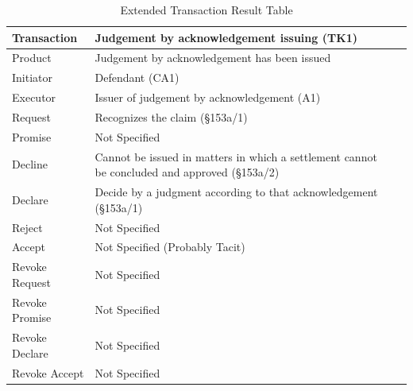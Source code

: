 \begin{landscape}
\begin{table}[h]
\caption{Extended Transaction Result Table}
\label{tab:etrt}
\begin{tabular}{|l||l|l|}
\hline
Transaction  & Judgement by acknowledgement issuing (TK1) \\ \hline
Product      & Judgement by acknowledgement has been issued   \\ \hline
Initiator      & Defendant (CA1) \\ \hline
Executor       & Issuer of judgement by acknowledgement (A1)      \\ \hline
Request        & Recognizes the claim (\S153a/1)   \\ \hline
Promise        & Not Specified   \\ \hline
Decline        &  Cannot be issued in matters in which a settlement cannot be concluded and approved  (\S153a/2)  \\ \hline
Declare        & Decide by a judgment according to that acknowledgement (\S153a/1)  \\ \hline
Reject         &  Not Specified   \\ \hline
Accept         & Not Specified (Probably Tacit) \\ \hline
Revoke Request & Not Specified \\ \hline
Revoke Promise & Not Specified \\ \hline
Revoke Declare & Not Specified  \\ \hline
Revoke Accept  &  Not Specified   \\ \hline
\end{tabular}
\end{table}


\end{landscape}
